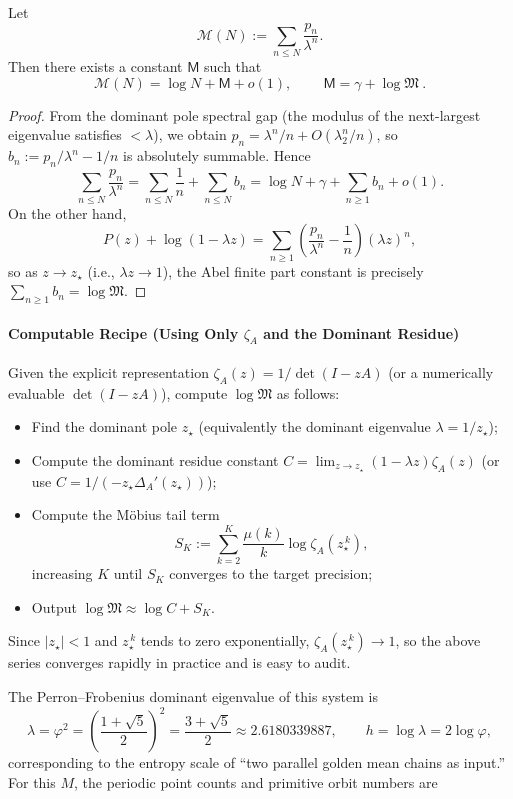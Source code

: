\begin{corollary}\label{cor:abel-mertens-constant-universal}
Let
\[
\mathcal{M}(N):=\sum_{n\le N}\frac{p_n}{\lambda^n}.
\]
Then there exists a constant $\mathsf{M}$ such that
\[
\mathcal{M}(N)=\log N+\mathsf{M}+o(1),
\qquad
\boxed{\ \mathsf{M}=\gamma+\log\mathfrak{M}\ }.
\]
\end{corollary}

\begin{proof}
From the dominant pole spectral gap (the modulus of the next-largest eigenvalue satisfies $<\lambda$), we obtain $p_n=\lambda^n/n+O(\lambda_2^n/n)$, so
\(
b_n:=p_n/\lambda^n-1/n
\)
is absolutely summable. Hence
\[
\sum_{n\le N}\frac{p_n}{\lambda^n}
=\sum_{n\le N}\frac{1}{n}+\sum_{n\le N}b_n
=\log N+\gamma+\sum_{n\ge 1}b_n+o(1).
\]
On the other hand,
\[
P(z)+\log(1-\lambda z)=\sum_{n\ge 1}\left(\frac{p_n}{\lambda^n}-\frac{1}{n}\right)(\lambda z)^n,
\]
so as $z\to z_\star$ (i.e., $\lambda z\to 1$), the Abel finite part constant is precisely $\sum_{n\ge 1}b_n=\log\mathfrak{M}$.
\end{proof}

\paragraph{Computable Recipe (Using Only $\zeta_A$ and the Dominant Residue)}
Given the explicit representation $\zeta_A(z)=1/\det(I-zA)$ (or a numerically evaluable $\det(I-zA)$), compute $\log\mathfrak{M}$ as follows:
\begin{itemize}
  \item Find the dominant pole $z_\star$ (equivalently the dominant eigenvalue $\lambda=1/z_\star$);
  \item Compute the dominant residue constant $C=\lim_{z\to z_\star}(1-\lambda z)\zeta_A(z)$ (or use $C=1/(-z_\star\Delta_A'(z_\star))$);
  \item Compute the M\"obius tail term
  \[
  S_K:=\sum_{k=2}^{K}\frac{\mu(k)}{k}\log\zeta_A(z_\star^{\,k}),
  \]
  increasing $K$ until $S_K$ converges to the target precision;
  \item Output
  \(
  \log\mathfrak{M}\approx \log C+S_K
  \).
\end{itemize}
Since $|z_\star|<1$ and $z_\star^{\,k}$ tends to zero exponentially, $\zeta_A(z_\star^{\,k})\to 1$, so the above series converges rapidly in practice and is easy to audit.

The Perron--Frobenius dominant eigenvalue of this system is
\[
\lambda=\varphi^2=\left(\frac{1+\sqrt5}{2}\right)^2=\frac{3+\sqrt5}{2}\approx 2.6180339887,
\qquad
h=\log\lambda=2\log\varphi,
\]
corresponding to the entropy scale of ``two parallel golden mean chains as input.'' For this $M$, the periodic point counts and primitive orbit numbers are

